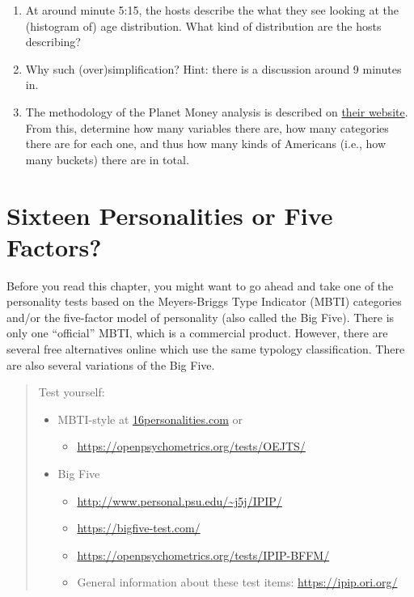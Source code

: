 \documentclass[openany]{book}
\providecommand{\tightlist}{%
  \setlength{\itemsep}{0pt}\setlength{\parskip}{0pt}}
\begin{document}
\begin{enumerate}
\def\labelenumi{\arabic{enumi}.}
\tightlist
\item
  At around minute 5:15, the hosts describe the what they see looking at the (histogram of) age distribution. What kind of distribution are the hosts describing?
\item
  Why such (over)simplification? Hint: there is a discussion around 9 minutes in.
\item
  The methodology of the Planet Money analysis is described on \href{https://www.npr.org/2019/08/28/755191639/episode-936-the-modal-american}{their website}. From this, determine how many variables there are, how many categories there are for each one, and thus how many kinds of Americans (i.e., how many buckets) there are in total.
\end{enumerate}

\hypertarget{sixteen-personalities-or-five-factors}{%
\chapter{Sixteen Personalities or Five Factors?}\label{sixteen-personalities-or-five-factors}}

Before you read this chapter, you might want to go ahead and take one of the personality tests based on
the Meyers-Briggs Type Indicator (MBTI) categories and/or the five-factor model of personality (also called the Big Five). There is only one ``official'' MBTI, which is a commercial product. However, there are several free alternatives online which use the same typology classification. There are also several variations of the Big Five.

\begin{quote}
Test yourself:

\begin{itemize}
\tightlist
\item
  MBTI-style at \url{16personalities.com} or

  \begin{itemize}
  \tightlist
  \item
    \url{https://openpsychometrics.org/tests/OEJTS/}
  \end{itemize}
\item
  Big Five

  \begin{itemize}
  \tightlist
  \item
    \url{http://www.personal.psu.edu/~j5j/IPIP/}
  \item
    \url{https://bigfive-test.com/}
  \item
    \url{https://openpsychometrics.org/tests/IPIP-BFFM/}
  \item
    General information about these test items: \url{https://ipip.ori.org/}
  \end{itemize}
\end{itemize}
\end{quote}
\end{document}
